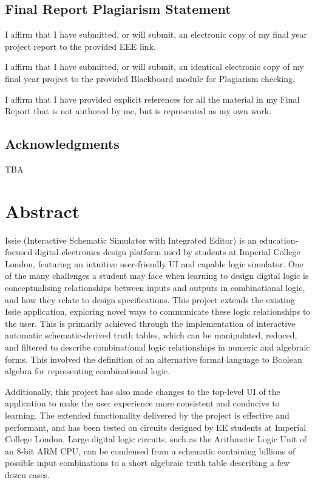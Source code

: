\clearpage
{}

\section*{Final Report Plagiarism Statement}

I affirm that I have submitted, or will submit, an electronic copy of my final year project report to the provided EEE link.

I affirm that I have submitted, or will submit, an identical electronic copy of my final year project to the provided Blackboard module for Plagiarism checking.

I affirm that I have provided explicit references for all the material in my Final Report that is not authored by me, but is represented as my own work.

\newpage

\section*{Acknowledgments}
TBA

\newpage

\chapter{Abstract}
Issie (Interactive Schematic Simulator with Integrated Editor) is an education-focused digital electronics design platform used by students at Imperial College London, featuring an intuitive user-friendly UI and capable logic simulator. One of the many challenges a student may face when learning to design digital logic is conceptualising relationships between inputs and outputs in combinational logic, and how they relate to design specifications. This project extends the existing Issie application, exploring novel ways to communicate these logic relationships to the user. This is primarily achieved through the implementation of interactive automatic schematic-derived truth tables, which can be manipulated, reduced, and filtered to describe combinational logic relationships in numeric and algebraic forms. This involved the definition of an alternative formal language to Boolean algebra for representing combinational logic. 

Additionally, this project has also made changes to the top-level UI of the application to make the user experience more consistent and conducive to learning.
The extended functionality delivered by the project is effective and performant, and has been tested on circuits designed by EE students at Imperial College London. Large digital logic circuits, such as the Arithmetic Logic Unit of an 8-bit ARM CPU, can be condensed from a schematic containing billions of possible input combinations to a short algebraic truth table describing a few dozen cases. 

\newpage

\tableofcontents